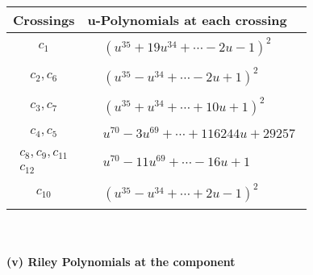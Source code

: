 \documentclass[1p]{elsarticle_modified}
\theoremstyle{definition}
\begin{document}
\begin{tabular}{m{50pt}|m{274pt}}
Crossings & \hspace{64pt}u-Polynomials at each crossing \\
\hline $$\begin{aligned}c_{1}\end{aligned}$$&$\begin{aligned}
&(u^{35}+19 u^{34}+\cdots-2 u-1)^{2}
\end{aligned}$\\
\hline $$\begin{aligned}c_{2},c_{6}\end{aligned}$$&$\begin{aligned}
&(u^{35}- u^{34}+\cdots-2 u+1)^{2}
\end{aligned}$\\
\hline $$\begin{aligned}c_{3},c_{7}\end{aligned}$$&$\begin{aligned}
&(u^{35}+u^{34}+\cdots+10 u+1)^{2}
\end{aligned}$\\
\hline $$\begin{aligned}c_{4},c_{5}\end{aligned}$$&$\begin{aligned}
&u^{70}-3 u^{69}+\cdots+116244 u+29257
\end{aligned}$\\
\hline $$\begin{aligned}c_{8},c_{9},c_{11}\\c_{12}\end{aligned}$$&$\begin{aligned}
&u^{70}-11 u^{69}+\cdots-16 u+1
\end{aligned}$\\
\hline $$\begin{aligned}c_{10}\end{aligned}$$&$\begin{aligned}
&(u^{35}- u^{34}+\cdots+2 u-1)^{2}
\end{aligned}$\\
\hline
\end{tabular}\\~\\
\newpage\renewcommand{\arraystretch}{1}
\flushleft \textbf{(v) Riley Polynomials at the component}\newline \\
\end{document}
